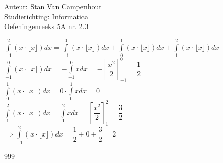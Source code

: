 \documentclass[a4paper]{article}
\begin{document}
  
\noindent \large Auteur: Stan Van Campenhout \\
\noindent \large Studierichting:  Informatica\\
\noindent \large Oefeningenreeks 5A nr. 2.3\\

\medskip

\normalsize

$ \displaystyle\int\limits_{-1}^2\left(x\cdot\lfloor x\rfloor\right) dx = \displaystyle\int\limits_{-1}^0\left(x\cdot\lfloor x\rfloor\right) dx 
+ \displaystyle\int\limits_0^1\left(x\cdot\lfloor x\rfloor\right) dx + \displaystyle\int\limits_1^2\left(x\cdot\lfloor x\rfloor\right) dx  $\\

$ \displaystyle\int\limits_{-1}^0\left(x\cdot\lfloor x\rfloor\right) dx  = -\displaystyle\int\limits_{-1}^0xdx =-\left[\dfrac{x^2}{2}\right]_{-1}^0 = \dfrac{1}{2} $\\

$ \displaystyle\int\limits_0^1\left(x\cdot\lfloor x\rfloor\right) dx = 0 \cdot \displaystyle\int\limits_0^1xdx = 0 $\\

$ \displaystyle\int\limits_1^2\left(x\cdot\lfloor x\rfloor\right) dx = \displaystyle\int\limits_1^2xdx = \left[\dfrac{x^2}{2}\right]_1^2 = \dfrac{3}{2} $\\

$ \Rightarrow \displaystyle\int\limits_{-1}^2\left(x\cdot\lfloor x\rfloor\right) dx = \dfrac{1}{2} + 0 + \dfrac{3}{2} = 2 $\\

\begin{thebibliography}{999}
\end{thebibliography}
\end{document}
